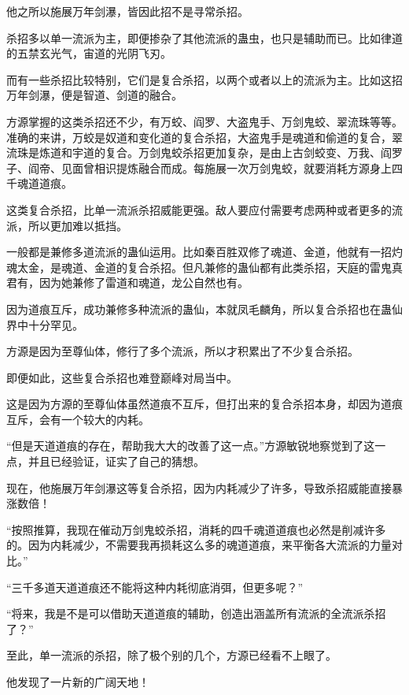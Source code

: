 \begin{this_body}
他之所以施展万年剑瀑，皆因此招不是寻常杀招。

杀招多以单一流派为主，即便掺杂了其他流派的蛊虫，也只是辅助而已。比如律道的五禁玄光气，宙道的光阴飞刃。

而有一些杀招比较特别，它们是复合杀招，以两个或者以上的流派为主。比如这招万年剑瀑，便是智道、剑道的融合。

方源掌握的这类杀招还不少，有万蛟、阎罗、大盗鬼手、万剑鬼蛟、翠流珠等等。准确的来讲，万蛟是奴道和变化道的复合杀招，大盗鬼手是魂道和偷道的复合，翠流珠是炼道和宇道的复合。万剑鬼蛟杀招更加复杂，是由上古剑蛟变、万我、阎罗子、阎帝、见面曾相识提炼融合而成。每施展一次万剑鬼蛟，就要消耗方源身上四千魂道道痕。

这类复合杀招，比单一流派杀招威能更强。敌人要应付需要考虑两种或者更多的流派，所以更加难以抵挡。

一般都是兼修多道流派的蛊仙运用。比如秦百胜双修了魂道、金道，他就有一招灼魂太金，是魂道、金道的复合杀招。但凡兼修的蛊仙都有此类杀招，天庭的雷鬼真君有，因为她兼修了雷道和魂道，龙公自然也有。

因为道痕互斥，成功兼修多种流派的蛊仙，本就凤毛麟角，所以复合杀招也在蛊仙界中十分罕见。

方源是因为至尊仙体，修行了多个流派，所以才积累出了不少复合杀招。

即便如此，这些复合杀招也难登巅峰对局当中。

这是因为方源的至尊仙体虽然道痕不互斥，但打出来的复合杀招本身，却因为道痕互斥，会有一个较大的内耗。

“但是天道道痕的存在，帮助我大大的改善了这一点。”方源敏锐地察觉到了这一点，并且已经验证，证实了自己的猜想。

现在，他施展万年剑瀑这等复合杀招，因为内耗减少了许多，导致杀招威能直接暴涨数倍！

“按照推算，我现在催动万剑鬼蛟杀招，消耗的四千魂道道痕也必然是削减许多的。因为内耗减少，不需要我再损耗这么多的魂道道痕，来平衡各大流派的力量对比。”

“三千多道天道道痕还不能将这种内耗彻底消弭，但更多呢？”

“将来，我是不是可以借助天道道痕的辅助，创造出涵盖所有流派的全流派杀招了？”

至此，单一流派的杀招，除了极个别的几个，方源已经看不上眼了。

他发现了一片新的广阔天地！

\end{this_body}

